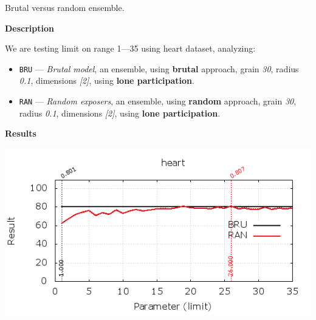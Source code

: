 \begin{experiment}{Brutal versus random ensemble.}{\small \sffamily\textbf{Description}

We are testing limit on range 1---35 using heart dataset, analyzing:

\begin{itemize}
\tightlist
	\item \texttt{BRU} --- \emph{Brutal model}, an ensemble, using \textbf{brutal} approach, grain \emph{30}, radius \emph{0.1}, dimensions \emph{[2]}, using \textbf{lone participation}.
	\item \texttt{RAN} --- \emph{Random \emph{exposers}}, an ensemble, using \textbf{random} approach, grain \emph{30}, radius \emph{0.1}, dimensions \emph{[2]}, using \textbf{lone participation}.

\end{itemize}


\textbf{Results}

\centering
	\includegraphics[width=.75\textwidth]{plots/experiment_4_heart.png}
	\label{fig:experiment_4}
}\end{experiment}